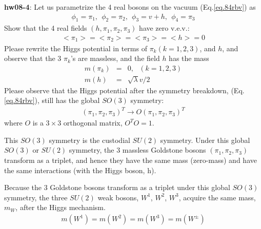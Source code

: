 \documentclass[12pt]{article}
\begin{document}
{\bf hw08-4}:
  Let us parametrize the 4 real bosons on the vacuum (Eq.\ref{eq.84rbv}) as
  \begin{eqnarray}
    \phi_1 = \pi_1,~~\phi_2 = \pi_2,~~\phi_3 = v + h,~~\phi_4 = \pi_3 \label{eq.84rbv4}
  \end{eqnarray}
  Show that the 4 real fields $(h, \pi_1, \pi_2, \pi_3)$ have zero v.e.v.:
  \begin{eqnarray}
    <\pi_1> = <\pi_2> = <\pi_3> = <h> = 0
  \end{eqnarray}
  Please rewrite the Higgs potential in terms of $\pi_k (k=1,2,3)$,
  and $h$, and observe that the 3 $\pi_k$'s are massless, and
  the field $h$ has the mass
  \begin{eqnarray}
    m(\pi_k) &=& 0,~~~   (k=1,2,3) \\
    m(h)     &=& \sqrt{\lambda} v/2
  \end{eqnarray}
  Please observe that the Higgs potential after the symmetry
  breakdown, (Eq.\ref{eq.84rbv}), still has the global $SO(3)$ symmetry:
  \begin{eqnarray}
    (\pi_1,\pi_2,\pi_3)^T \to O (\pi_1,\pi_2,\pi_3)^T
  \end{eqnarray}
   where $O$ is a $3\times 3$ orthogonal matrix, $O^T O = 1$.

  This $SO(3)$ symmetry is the custodial $SU(2)$ symmetry.
  Under this global $SO(3)$ or $SU(2)$ symmetry, the $3$ massless
  Goldstone bosons $(\pi_1, \pi_2, \pi_3)$ transform as a triplet,
  and hence they have the same mass (zero-mass) and have the
  same interactions (with the Higgs boson, h).

  Because the 3 Goldstone bosons transform as a triplet under this
  global $SO(3)$ symmetry, the three $SU(2)$ weak bosons, $W^1$, $W^2$, $W^3$,
  acquire the same mass, $m_W$, after the Higgs mechanism.
\begin{eqnarray}
  m(W^1) = m(W^2) = m(W^3) = m(W^\pm) \label{eq.8mw}
\end{eqnarray}
\end{document}

